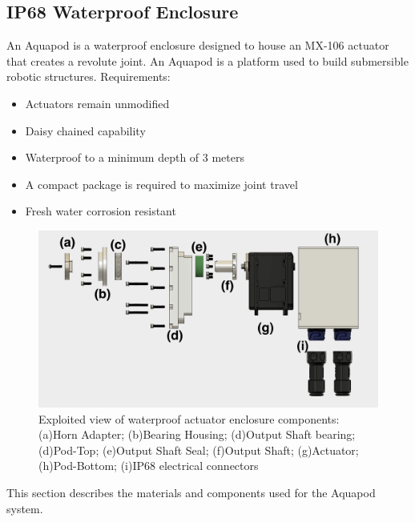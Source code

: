 \subsection{IP68 Waterproof Enclosure}
An Aquapod is a waterproof enclosure designed to house an MX-106 actuator that creates a revolute joint. An Aquapod is a platform used to build submersible robotic structures.
Requirements: 
\begin{itemize}
    \item Actuators remain unmodified 
    
    \item Daisy chained capability

    \item Waterproof to a minimum depth of 3 meters

    \item A compact package is required to maximize joint travel

    \item Fresh water corrosion resistant
    
\end{itemize}



\begin{figure}[h]
\centering
\includegraphics[width=1.0\columnwidth]{./img/aquaPod-exploded.png}
\caption{Exploited view of waterproof actuator enclosure components: (a)Horn Adapter; (b)Bearing Housing; (d)Output Shaft bearing; (d)Pod-Top; (e)Output Shaft Seal; (f)Output Shaft; (g)Actuator; (h)Pod-Bottom; (i)IP68 electrical connectors }
\label{fig:pod exploted}
\end{figure}


This section describes the materials and components used for the Aquapod system.


